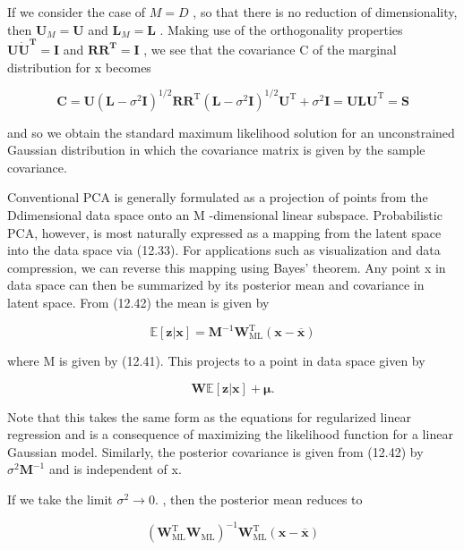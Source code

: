 \documentclass[
  10
]{article}
\begin{document}
If we consider the case of \(M = D\) , so that there is no reduction of
dimensionality, then \(\mathbf { U } _ { M } = \mathbf { U }\) and
\(\mathbf { L } _ { M } = \mathbf { L }\) . Making use of the
orthogonality properties
\(\mathbf { U } \dot { \mathbf { U } } ^ { \mathbf { T } } = \mathbf { I }\)
and \(\mathbf { R R } ^ { \mathbf { T } } = \mathbf { I }\) , we see
that the covariance C of the marginal distribution for x becomes

\[
\mathbf {C} = \mathbf {U} (\mathbf {L} - \sigma^ {2} \mathbf {I}) ^ {1 / 2} \mathbf {R R} ^ {\mathrm{T}} (\mathbf {L} - \sigma^ {2} \mathbf {I}) ^ {1 / 2} \mathbf {U} ^ {\mathrm{T}} + \sigma^ {2} \mathbf {I} = \mathbf {U L U} ^ {\mathrm{T}} = \mathbf {S}\tag{12.47}
\]

and so we obtain the standard maximum likelihood solution for an
unconstrained Gaussian distribution in which the covariance matrix is
given by the sample covariance.

Conventional PCA is generally formulated as a projection of points from
the Ddimensional data space onto an M -dimensional linear subspace.
Probabilistic PCA, however, is most naturally expressed as a mapping
from the latent space into the data space via (12.33). For applications
such as visualization and data compression, we can reverse this mapping
using Bayes' theorem. Any point x in data space can then be summarized
by its posterior mean and covariance in latent space. From (12.42) the
mean is given by

\[
\mathbb {E} [ \mathbf {z} | \mathbf {x} ] = \mathbf {M} ^ {- 1} \mathbf {W} _ {\mathrm{ML}} ^ {\mathrm{T}} (\mathbf {x} - \overline {{\mathbf {x}}})\tag{12.48}
\]

where M is given by (12.41). This projects to a point in data space
given by

\[
\mathbf {W} \mathbb {E} [ \mathbf {z} | \mathbf {x} ] + \boldsymbol {\mu}.\tag{12.49}
\]

Note that this takes the same form as the equations for regularized
linear regression and is a consequence of maximizing the likelihood
function for a linear Gaussian model. Similarly, the posterior
covariance is given from (12.42) by
\(\sigma ^ { 2 } \mathbf { M } ^ { - 1 }\) and is independent of x.

If we take the limit \(\sigma ^ { 2 } \to 0 .\) , then the posterior
mean reduces to

\[
(\mathbf {W} _ {\mathrm{ML}} ^ {\mathrm{T}} \mathbf {W} _ {\mathrm{ML}}) ^ {- 1} \mathbf {W} _ {\mathrm{ML}} ^ {\mathrm{T}} (\mathbf {x} - \overline {{\mathbf {x}}})\tag{12.50}
\]
\end{document}
